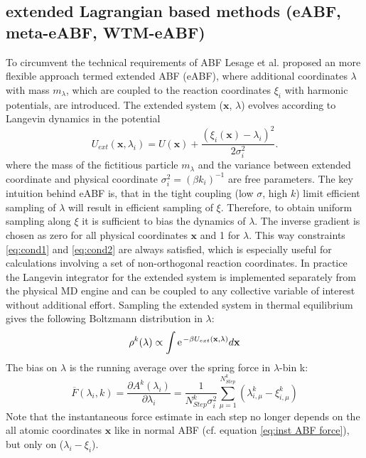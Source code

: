 \subsection{extended Lagrangian based methods (eABF, meta-eABF, WTM-eABF)}
\label{sec:eABF}
To circumvent the technical requirements of ABF Lesage et al.\autocite{lesage2017smoothed} proposed an more flexible approach termed extended ABF (eABF), where additional coordinates $\lambda$ with mass $m_{\lambda}$, which are coupled to the reaction coordinates $\xi_i$ with harmonic potentials, are introduced. The extended system ($\textbf{x}$, $\lambda$) evolves according to Langevin dynamics in the potential
\begin{equation}
  U_{ext}(\textbf{x},\lambda_i) = U(\textbf{x}) + \frac{(\xi_{i}(\textbf{x})-\lambda_i)^2}{2\sigma_i^2}.
\end{equation}
where the mass of the fictitious particle $m_\lambda$ and the variance between extended coordinate and physical coordinate $\sigma_i^2=(\beta k_i)^{-1}$ are free parameters.
The key intuition behind eABF is, that in the tight coupling (low $\sigma$, high $k$) limit efficient sampling of $\lambda$ will result in efficient sampling of $\xi$.
Therefore, to obtain uniform sampling along $\xi$ it is sufficient to bias the dynamics of $\lambda$. The inverse gradient is chosen as zero for all physical coordinates $\textbf{x}$ and 1 for $\lambda$.
This way constraints \ref{eq:cond1} and \ref{eq:cond2} are always satisfied, which is especially useful for calculations involving a set of non-orthogonal reaction coordinates.
In practice the Langevin integrator for the extended system is implemented separately from the physical MD engine and can be coupled to any collective variable of interest without additional effort.
Sampling the extended system in thermal equilibrium gives the following Boltzmann distribution in $\lambda$:
\begin{equation}
  \rho^k(\lambda) \propto \int \e^{-\beta U_{ext}(\textbf{x},\lambda)} d\textbf{x} \\
\end{equation}
The bias on $\lambda$ is the running average over the spring force in $\lambda$-bin k:
\begin{equation}
  \overline{F}(\lambda_{i}, k) = \frac{\partial A^{k}(\lambda_{i})}{\partial \lambda_i} = \frac{1}{N_{Step}^{k}\sigma_i^2} \sum_{\mu=1}^{N_{Step}^{k}} (\lambda_{i,\mu}^{k}-\xi_{i,\mu}^{k})
  \label{eq:eABF bias}
\end{equation}
Note that the instantaneous force estimate in each step no longer depends on the all atomic coordinates $\textbf{x}$ like in normal ABF (cf. equation \ref{eq:inst ABF force}), but only on ($\lambda_i - \xi_i$).
